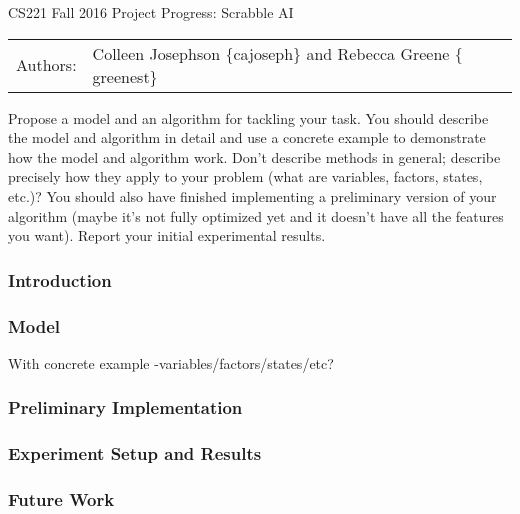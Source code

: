 \documentclass[12pt]{article}
\begin{document}
\begin{center}
{\Large CS221 Fall 2016 Project Progress: Scrabble AI}

\begin{tabular}{rl}
  Authors: & Colleen Josephson $\{$cajoseph$\}$ and Rebecca Greene $\{$greenest$\}$\\
\end{tabular}
\end{center}

Propose a model and an algorithm for tackling your task. You should
describe the model and algorithm in detail and use a concrete example
to demonstrate how the model and algorithm work. Don't describe
methods in general; describe precisely how they apply to your problem
(what are variables, factors, states, etc.)? You should also have
finished implementing a preliminary version of your algorithm (maybe
it's not fully optimized yet and it doesn't have all the features you
want). Report your initial experimental results.


\subsubsection*{Introduction}

\subsubsection*{Model}
With concrete example
-variables/factors/states/etc?

\subsubsection*{Preliminary Implementation}

\subsubsection*{Experiment Setup and Results}

\subsubsection*{Future Work}
\end{document}

